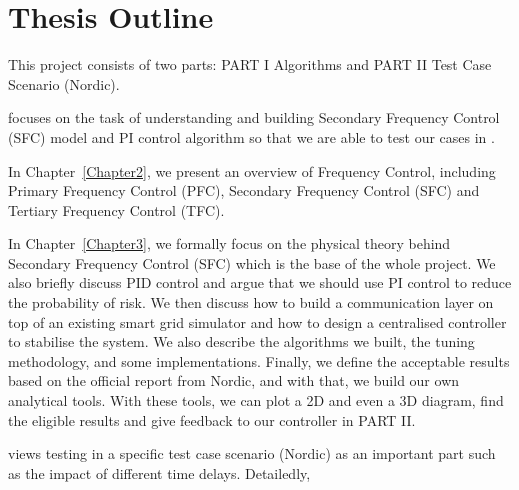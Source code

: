 \section{Thesis Outline} %
This project consists of two parts: PART I Algorithms and PART II Test Case Scenario (Nordic). 

 focuses on the task of understanding and building Secondary Frequency Control (SFC) model and PI control algorithm so that we are able to test our cases in .

\begin{description}
    \item In Chapter~\ref{Chapter2}, we present an overview of Frequency Control, including Primary Frequency Control (PFC), Secondary Frequency Control (SFC) and Tertiary Frequency Control (TFC). 
    \item In Chapter~\ref{Chapter3}, we formally focus on the physical theory behind Secondary Frequency Control (SFC) which is the base of the whole project. We also briefly discuss PID control and argue that we should use PI control to reduce the probability of risk. We then discuss how to build a communication layer on top of an existing smart grid simulator and how to design a centralised controller to stabilise the system. We also describe the algorithms we built, the tuning methodology, and some implementations. Finally, we define the acceptable results based on the official report from Nordic, and with that, we build our own analytical tools. With these tools, we can plot a 2D and even a 3D diagram, find the eligible results and give feedback to our controller in PART II.
\end{description}

 views testing in a specific test case scenario (Nordic) as an important part such as the impact of different time delays. Detailedly, 

